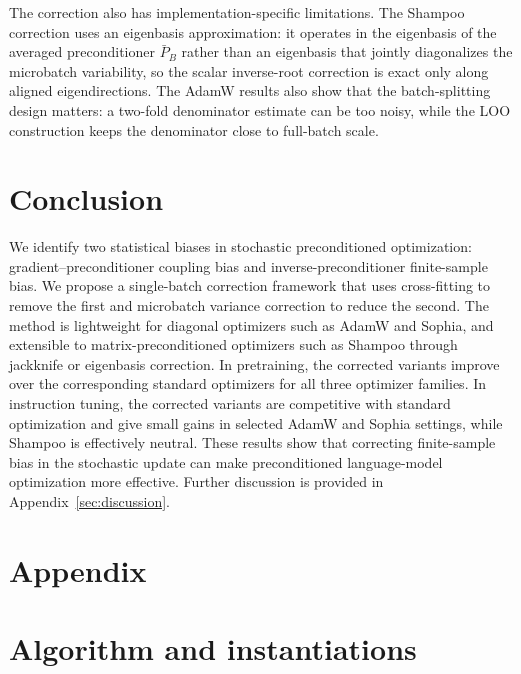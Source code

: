 \documentclass{article}
\begin{document}
The correction also has implementation-specific limitations. The Shampoo correction uses an eigenbasis approximation: it operates in the eigenbasis of the averaged preconditioner $\bar P_B$ rather than an eigenbasis that jointly diagonalizes the microbatch variability, so the scalar inverse-root correction is exact only along aligned eigendirections. The AdamW results also show that the batch-splitting design matters: a two-fold denominator estimate can be too noisy, while the LOO construction keeps the denominator close to full-batch scale.

\section{Conclusion}
\label{sec:conclusion}

We identify two statistical biases in stochastic preconditioned optimization: gradient--preconditioner coupling bias and inverse-preconditioner finite-sample bias. We propose a single-batch correction framework that uses cross-fitting to remove the first and microbatch variance correction to reduce the second. The method is lightweight for diagonal optimizers such as AdamW and Sophia, and extensible to matrix-preconditioned optimizers such as Shampoo through jackknife or eigenbasis correction. In pretraining, the corrected variants improve over the corresponding standard optimizers for all three optimizer families. In instruction tuning, the corrected variants are competitive with standard optimization and give small gains in selected AdamW and Sophia settings, while Shampoo is effectively neutral. These results show that correcting finite-sample bias in the stochastic update can make preconditioned language-model optimization more effective. Further discussion is provided in Appendix~\ref{sec:discussion}.

\clearpage




\clearpage
\appendix

\section*{Appendix}
\label{app:appendix}

\section{Algorithm and instantiations}
\label{sec:algorithm}
\end{document}
